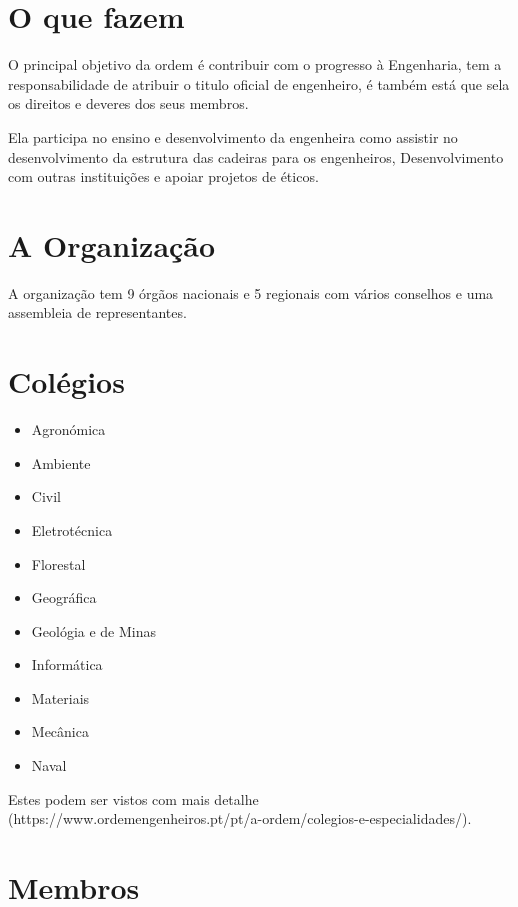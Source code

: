 \section{O que fazem}

O principal objetivo da ordem é contribuir com o progresso à Engenharia, tem a responsabilidade de atribuir o titulo oficial de engenheiro, é também está que sela os direitos e deveres dos seus membros.

Ela participa no ensino e desenvolvimento da engenheira como assistir no desenvolvimento da estrutura das cadeiras para os engenheiros, Desenvolvimento com outras instituições e apoiar projetos de éticos.

\section{A Organização}

A organização tem 9  órgãos nacionais e 5 regionais com vários conselhos e uma assembleia de representantes.

\section{Colégios}

\begin{itemize}
    \item Agronómica
    \item Ambiente
    \item Civil
    \item Eletrotécnica
    \item Florestal
    \item Geográfica
    \item Geológia e de Minas
    \item Informática
    \item Materiais
    \item Mecânica
    \item Naval
\end{itemize}

Estes podem ser vistos com mais detalhe 
\\
(https://www.ordemengenheiros.pt/pt/a-ordem/colegios-e-especialidades/).



\section{Membros}

